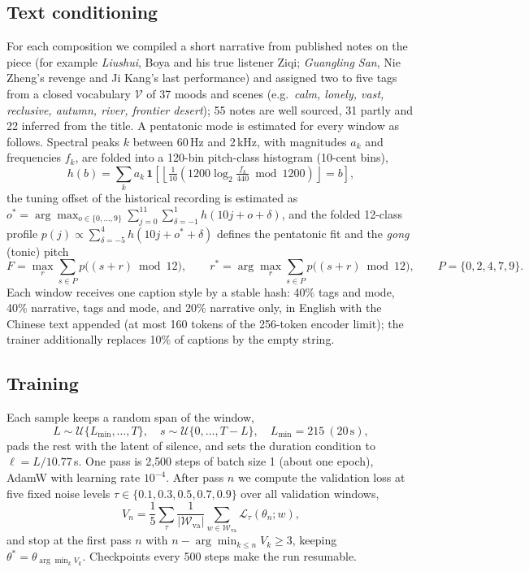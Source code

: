 \subsection{Text conditioning}
For each composition we compiled a short narrative from published notes on the piece (for example
\textit{Liushui}, Boya and his true listener Ziqi; \textit{Guangling San}, Nie Zheng's revenge and Ji Kang's last
performance) and assigned two to five tags from a closed vocabulary $\mathcal{V}$ of 37 moods and scenes (e.g.\
\textit{calm, lonely, vast, reclusive, autumn, river, frontier desert}); 55 notes are well sourced, 31 partly and 22
inferred from the title. A pentatonic mode is estimated for every window as follows. Spectral peaks $k$ between
60\,Hz and 2\,kHz, with magnitudes $a_k$ and frequencies $f_k$, are folded into a 120-bin pitch-class histogram
(10-cent bins),
\begin{equation}
  h(b) = \sum_{k} a_k \,\mathbf{1}\!\left[\left\lfloor \tfrac{1}{10}\left(1200\log_2\tfrac{f_k}{440} \bmod 1200\right)\right\rfloor = b\right],
\end{equation}
the tuning offset of the historical recording is estimated as
$o^\ast = \arg\max_{o\in\{0,\dots,9\}} \sum_{j=0}^{11}\sum_{\delta=-1}^{1} h(10j+o+\delta)$, and the folded
12-class profile $p(j)\propto \sum_{\delta=-5}^{4} h(10j+o^\ast+\delta)$ defines the pentatonic fit and the
\emph{gong} (tonic) pitch
\begin{equation}
  F = \max_{r} \sum_{s\in P} p\big((s+r) \bmod 12\big), \qquad
  r^\ast = \arg\max_{r} \sum_{s\in P} p\big((s+r) \bmod 12\big), \qquad P = \{0,2,4,7,9\}.
  \label{eq:fit}
\end{equation}
Each window receives one caption style by a stable hash: 40\% tags and mode, 40\% narrative, tags and mode, and 20\%
narrative only, in English with the Chinese text appended (at most 160 tokens of the 256-token encoder limit); the
trainer additionally replaces 10\% of captions by the empty string.

\subsection{Training}
Each sample keeps a random span of the window,
\begin{equation}
  L \sim \mathcal{U}\{L_{\min}, \dots, T\},\quad s \sim \mathcal{U}\{0, \dots, T-L\}, \quad L_{\min} = 215\ (20\,\mathrm{s}),
\end{equation}
pads the rest with the latent of silence, and sets the duration condition to $\ell = L/10.77$\,s. One pass is
2{,}500 steps of batch size 1 (about one epoch), AdamW with learning rate $10^{-4}$. After pass $n$ we compute the
validation loss at five fixed noise levels $\tau\in\{0.1,0.3,0.5,0.7,0.9\}$ over all validation windows,
\begin{equation}
  V_n = \frac{1}{5}\sum_{\tau} \frac{1}{|\mathcal{W}_{\mathrm{va}}|}\sum_{w\in\mathcal{W}_{\mathrm{va}}}
  \mathcal{L}_\tau(\theta_n; w),
\end{equation}
and stop at the first pass $n$ with $n - \arg\min_{k\le n} V_k \ge 3$, keeping
$\theta^\ast = \theta_{\arg\min_k V_k}$. Checkpoints every 500 steps make the run resumable.

